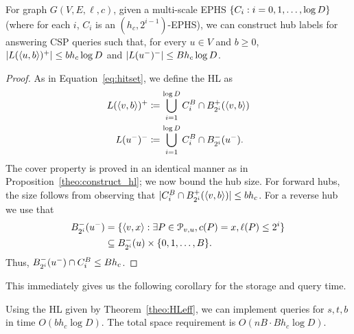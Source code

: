 \begin{theorem}
\label{theo:HLeff}
For graph $G(V,E,\ell,c)$, given a multi-scale EPHS $\crl*{C_i:i=0,1,\ldots,\log D}$ (where for each $i$, $C_i$ is an $(h_c,2^{i-1})$-EPHS), we can construct hub labels for answering CSP queries such that, for every $u\in V$ and $b\geq 0$, $\card{L(\pp{u,b})^+}\leq bh_c\log D$ and $\card{L(u^-)^-}\leq Bh_c\log D$. 
\end{theorem}
\begin{proof}
As in Equation~\eqref{eq:hitset}, we define the HL as
\begin{align*}
L(\pp{v,b})^+ &\defeq \bigcup_{i=1}^{\log D} C_i^B\cap \Bf_{2^i}(\pp{v,b})\\
L(u^-)^-  &\defeq \bigcup_{i=1}^{\log D} C_i^B\cap \Bb_{2^i}(u^-).
\end{align*}
The cover property is proved in an identical manner as in Proposition~\ref{theo:construct_hl}; we now bound the hub size.
For forward hubs, the size follows from observing that $ \card{C_i^B\cap \Bf_{2^i}(\pp{v,b})}\leq bh_c$.
For a reverse hub we use that 
\begin{align*}
\Bb_{2^i}(u^-) &= \{\pp{v,x}: \exists P\in \calP_{v,u}, c(P)=x, \ell(P)\leq 2^i\}\\
&\subseteq \Bb_{2^i}(u)\times \{0,1,\ldots,B\}.
\end{align*}
Thus, $\Bb_{2^i}(u^-)\cap C_i^B\leq Bh_c$.
\end{proof}

This immediately gives us the following corollary for the storage and query time.
\begin{corollary}
Using the HL given by Theorem~\ref{theo:HLeff}, we can implement queries for $s,t,b$ in time $O(b h_c\log D)$.
The total space requirement is $O(nB \cdot Bh_c\log D)$.
\end{corollary}


